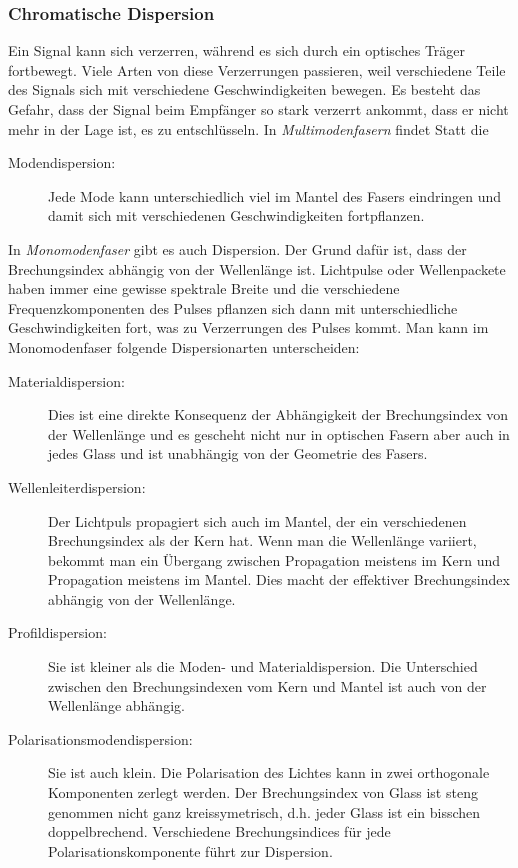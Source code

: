 \documentclass[a4paper]{article}
\begin{document}
\subsubsection{Chromatische Dispersion}
Ein Signal kann sich verzerren, w\"ahrend es sich durch ein optisches
Tr\"ager fortbewegt. Viele Arten von diese Verzerrungen passieren, weil
verschiedene Teile des Signals sich mit verschiedene Geschwindigkeiten
bewegen. Es besteht das Gefahr, dass der Signal beim Empf\"anger so
stark verzerrt ankommt, dass er nicht mehr in der Lage ist, es zu
entschl\"usseln. In \emph{Multimodenfasern} findet Statt die 
\begin{description}
  \item[Modendispersion:] Jede Mode kann unterschiedlich
    viel im Mantel des Fasers eindringen und damit sich mit verschiedenen
    Geschwindigkeiten fortpflanzen.
\end{description} In \emph{Monomodenfaser} gibt es auch Dispersion. Der Grund
daf\"ur ist, dass der Brechungsindex abh\"angig von der Wellenl\"ange ist.
Lichtpulse oder Wellenpackete haben immer eine gewisse spektrale Breite und die
verschiedene Frequenzkomponenten des Pulses pflanzen sich dann mit
unterschiedliche Geschwindigkeiten fort, was zu Verzerrungen des Pulses kommt.
Man kann im Monomodenfaser folgende Dispersionarten unterscheiden:
\begin{description}
  \item[Materialdispersion:] Dies ist eine direkte Konsequenz der
    Abh\"angigkeit der Brechungsindex von der  Wellenl\"ange und es gescheht
    nicht nur in optischen Fasern aber auch in jedes Glass und ist unabh\"angig von
    der Geometrie des Fasers.
  \item[Wellenleiterdispersion:] Der Lichtpuls propagiert sich auch im Mantel,
    der ein verschiedenen Brechungsindex als der Kern hat. Wenn man die
    Wellenl\"ange variiert, bekommt man ein \"Ubergang zwischen Propagation
    meistens im Kern und Propagation meistens im Mantel. Dies macht der
    effektiver Brechungsindex abh\"angig von der Wellenl\"ange.
  \item[Profildispersion:] Sie ist kleiner als die Moden- und
    Materialdispersion. Die Unterschied zwischen den Brechungsindexen vom Kern
    und Mantel ist auch von der Wellenl\"ange abh\"angig.
  \item[Polarisationsmodendispersion:] Sie ist auch klein. Die Polarisation des
    Lichtes kann in zwei orthogonale Komponenten zerlegt werden. Der
    Brechungsindex von Glass ist steng genommen nicht ganz kreissymetrisch,
    d.h. jeder Glass ist ein bisschen doppelbrechend. Verschiedene
  Brechungsindices f\"ur jede Polarisationskomponente f\"uhrt zur Dispersion.
\end{description}
\end{document}
